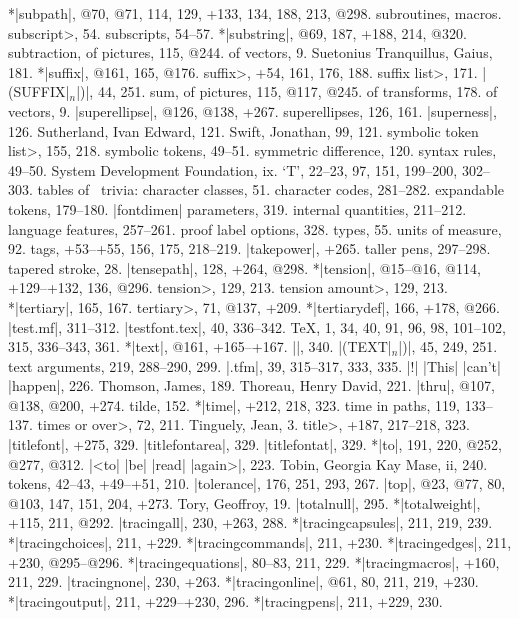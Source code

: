 *|subpath|, @70, @71, 114, 129, +133, 134, 188, 213, @298.
subroutines, \see macros.
\<subscript>, 54.
subscripts, 54--57.
*|substring|, @69, 187, +188, 214, @320.
subtraction, of pictures, 115, @244.
\sub of vectors, 9.
Suetonius Tranquillus, Gaius, 181.
*|suffix|, @161, 165, @176.
\<suffix>, +54, 161, 176, 188.
\<suffix list>, 171.
|(SUFFIX|$_n$|)|, 44, 251.
sum, of pictures, 115, @117, @245.
\sub of transforms, 178.
\sub of vectors, 9.
|superellipse|, @126, @138, +267.
superellipses, 126, 161.
|superness|, 126.
Sutherland, Ivan Edward, 121.
Swift, Jonathan, 99, 121.
\<symbolic token list>, 155, 218.
symbolic tokens, 49--51.
symmetric difference, 120.
syntax rules, 49--50.
System Development Foundation, ix.
\newletter
`T', 22--23, 97, 151, 199--200, 302--303.
tables of \MF\ trivia:
\sub character classes, 51.
\sub character codes, 281--282.
\sub expandable tokens, 179--180.
\sub |fontdimen| parameters, 319.
\sub internal quantities, 211--212.
\sub language features, 257--261.
\sub proof\/ label options, 328.
\sub types, 55.
\sub units of measure, 92.
tags, +53--+55, 156, 175, 218--219.
|takepower|, +265.
taller pens, 297--298.
tapered stroke, 28.
|tensepath|, 128, +264, @298.
*|tension|, @15--@16, @114, +129--+132, 136, @296.
\<tension>, 129, 213.
\<tension amount>, 129, 213.
*|tertiary|, 165, 167.
\<tertiary>, 71, @137, +209.
*|tertiarydef|, 166, +178, @266.
|test.mf|, 311--312.
|testfont.tex|, 40, 336--342.
\TeX, 1, 34, 40, 91, 96, 98, 101--102, 315, 336--343, 361.
*|text|, @161, +165--+167.
|\text|, 340.
|(TEXT|$_n$|)|, 45, 249, 251.
text arguments, 219, 288--290, 299.
|.tfm|, 39, 315--317, 333, 335.
|!| |This| |can't| |happen|, 226.
Thomson, James, 189.
Thoreau, Henry David, 221.
|thru|, @107, @138, @200, +274.
tilde, 152.
*|time|, +212, 218, 323.
time in paths, 119, 133--137.
\<times or over>, 72, 211.
Tinguely, Jean, 3.
\<title>, +187, 217--218, 323.
|titlefont|, +275, 329.
|titlefontarea|, 329.
|titlefontat|, 329.
*|to|, 191, 220, @252, @277, @312.
|<to| |be| |read| |again>|, 223.
Tobin, Georgia Kay Mase, ii, 240.
tokens, 42--43, +49--+51, 210.
|tolerance|, 176, 251, 293, 267.
|top|, @23, @77, 80, @103, 147, 151, 204, +273.
Tory, Geoffroy, 19.
|totalnull|, 295.
*|totalweight|, +115, 211, @292.
|tracingall|, 230, +263, 288.
*|tracingcapsules|, 211, 219, 239.
*|tracingchoices|, 211, +229.
*|tracingcommands|, 211, +230.
*|tracingedges|, 211, +230, @295--@296.
*|tracingequations|, 80--83, 211, 229.
*|tracingmacros|, +160, 211, 229.
|tracingnone|, 230, +263.
*|tracingonline|, @61, 80, 211, 219, +230.
*|tracingoutput|, 211, +229--+230, 296.
*|tracingpens|, 211, +229, 230.
